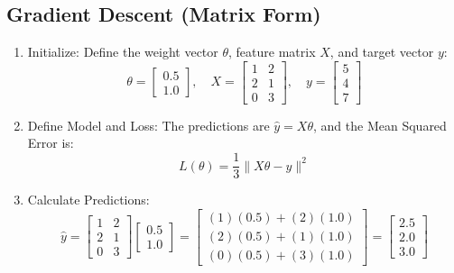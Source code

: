 \newpage

\subsection{Gradient Descent (Matrix Form)}

\begin{enumerate}
    \setlength{\itemsep}{1em}
    \item Initialize: Define the weight vector $\theta$, feature matrix $X$, and target vector $y$:
    $$\theta = \begin{bmatrix} 0.5 \\ 1.0 \end{bmatrix}, \quad X = \begin{bmatrix} 1 & 2 \\ 2 & 1 \\ 0 & 3 \end{bmatrix}, \quad y = \begin{bmatrix} 5 \\ 4 \\ 7 \end{bmatrix}$$
    
    \item Define Model and Loss:
    The predictions are $\hat{y} = X\theta$, and the Mean Squared Error is:
    $$L(\theta) = \frac{1}{3} \|X\theta - y\|^2$$

    \item Calculate Predictions:
    $$\hat{y} = \begin{bmatrix} 1 & 2 \\ 2 & 1 \\ 0 & 3 \end{bmatrix} \begin{bmatrix} 0.5 \\ 1.0 \end{bmatrix} = \begin{bmatrix} (1)(0.5) + (2)(1.0) \\ (2)(0.5) + (1)(1.0) \\ (0)(0.5) + (3)(1.0) \end{bmatrix} = \begin{bmatrix} 2.5 \\ 2.0 \\ 3.0 \end{bmatrix}$$


\end{enumerate}
